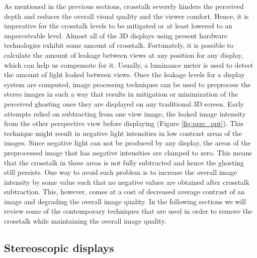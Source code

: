As mentioned in the previous sections, crosstalk severely hinders the perceived depth and reduces the overall visual quality and the viewer comfort. Hence, it is imperative for the crosstalk levels to be mitigated or at least lowered to an unperceivable level. Almost all of the 3D displays using present hardware technologies exhibit some amount of crosstalk. Fortunately, it is possible to calculate the amount of leakage between views at any position for any display, which can help us compensate for it. Usually, a luminance meter is used to detect the amount of light leaked between views. Once the leakage levels for a display system are computed, image processing techniques can be used to preprocess the stereo images in such a way that results in mitigation or minimization of the perceived ghosting once they are displayed on any traditional 3D screen. Early attempts relied on subtracting from one view image, the leaked image intensity from the other perspective view before displaying (Figure \ref{fig:perc_opt}). This technique might result in  negative light intensities in low contrast areas of the images. Since negative light can not be produced by any display, the areas of the preprocessed image that has negative intensities are clamped to zero. This means that the crosstalk in these areas is not fully subtracted and hence the ghosting still persists. One way to avoid such problem is to increase the overall image intensity by some value such that no negative values are obtained after crosstalk subtraction. This, however, comes at a cost of decreased average contrast of an image and degrading the overall image quality. In the following sections we will review some of the contemporary techniques that are used in order to remove the crosstalk while maintaining the overall image quality.

\subsection{Stereoscopic displays}

